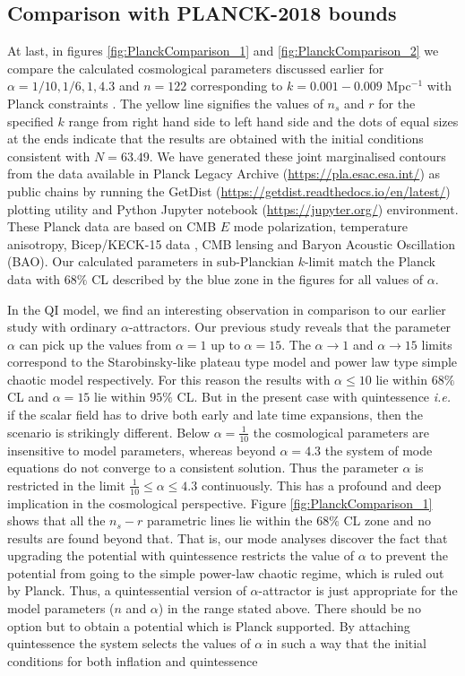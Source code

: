 \documentclass[a4paper,11pt]{article}
\begin{document}
\subsection{Comparison with PLANCK-2018 bounds}
\label{subsec:PLACKcomp}
At last, in figures \ref{fig:PlanckComparison_1} and \ref{fig:PlanckComparison_2} we compare the calculated cosmological parameters discussed earlier for $\alpha = 1/10, 1/6, 1, 4.3$ and $n=122$ corresponding to $k=0.001 - 0.009$ Mpc$^{-1}$ with Planck constraints \cite{Planck:2018vyg,Planck:2018jri}. The yellow line signifies the values of $n_s$ and $r$ for the specified $k$ range from right hand side to left hand side and the dots of equal sizes at the ends indicate that the results are obtained with the initial conditions consistent with $N=63.49$. We have generated these joint marginalised contours from the data available in Planck Legacy Archive (\url{https://pla.esac.esa.int/}) as public chains by running the GetDist (\url{https://getdist.readthedocs.io/en/latest/}) plotting utility and Python Jupyter notebook (\url{https://jupyter.org/}) environment. These Planck data are based on CMB $E$ mode polarization, temperature anisotropy, Bicep/KECK-15 data \cite{BICEP2:2015nss}, CMB lensing and Baryon Acoustic Oscillation (BAO). Our calculated parameters in sub-Planckian $k$-limit match the Planck data with $68\%$ CL described by the blue zone in the figures for all values of $\alpha$.\par In the QI model, we find an interesting observation in comparison to our earlier study \cite{Sarkar:2021ird} with ordinary $\alpha$-attractors. Our previous study reveals that the parameter $\alpha$ can pick up the values from $\alpha=1$ up to $\alpha=15$. The $\alpha\rightarrow 1$ and $\alpha\rightarrow 15$ limits correspond to the Starobinsky-like plateau type model and power law type simple chaotic model respectively. For this reason the results with $\alpha\leq 10$ lie within $68\%$ CL and $\alpha=15$ lie within $95\%$ CL. But in the present case with quintessence \textit{i.e.} if the scalar field has to drive both early and late time expansions, then the scenario is strikingly different. Below $\alpha=\frac{1}{10}$ the cosmological parameters are insensitive to model parameters, whereas beyond $\alpha=4.3$ the system of mode equations do not converge to a consistent solution. Thus the parameter $\alpha$ is restricted in the limit $\frac{1}{10}\leq\alpha\leq 4.3$ continuously. This has a profound and deep implication in the cosmological perspective. Figure \ref{fig:PlanckComparison_1} shows that all the $n_s - r$ parametric lines lie within the $68\%$ CL zone and no results are found beyond that. That is, our mode analyses discover the fact that upgrading the potential with quintessence restricts the value of $\alpha$ to prevent the potential from going to the simple power-law chaotic regime, which is ruled out by Planck. Thus, a quintessential version of $\alpha$-attractor is just appropriate for the model parameters ($n$ and $\alpha$) in the range stated above. There should be no option but to obtain a potential which is Planck supported. By attaching quintessence the system selects the values of $\alpha$ in such a way that the initial conditions for both inflation and quintessence 
\end{document}
